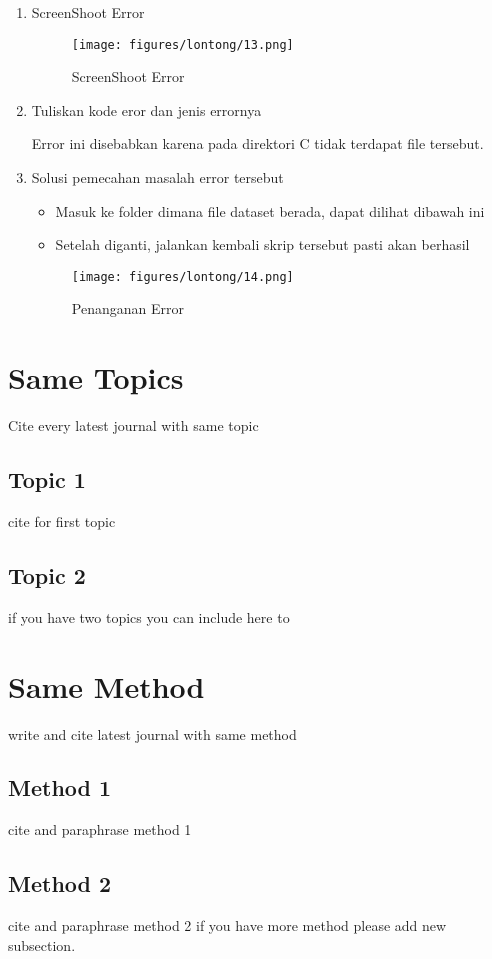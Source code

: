 \begin{enumerate}
	\item
ScreenShoot Error
\begin{figure}[ht]
\centering
\texttt{[image: figures/lontong/13.png]}
\caption{ScreenShoot Error}
\end{figure}
	\item
Tuliskan kode eror dan jenis errornya
\par
Error ini disebabkan karena pada direktori C tidak terdapat file tersebut. 
	\item
Solusi pemecahan masalah error tersebut
\begin{itemize}
\item 	Masuk ke folder dimana file dataset berada, dapat dilihat dibawah ini
\item 	Setelah diganti, jalankan kembali skrip tersebut pasti akan berhasil
\end{itemize}
\begin{figure}[ht]
\centering
\texttt{[image: figures/lontong/14.png]}
\caption{Penanganan Error}
\end{figure}

\end{enumerate}

\section{Same Topics}
Cite every latest journal with same topic
\subsection{Topic 1}
cite for first topic

\subsection{Topic 2}
if you have two topics you can include here to


\section{Same Method}
write and cite latest journal with same method

\subsection{Method 1}
cite and paraphrase method 1

\subsection{Method 2}
cite and paraphrase method 2 if you have more method please add new subsection.

 